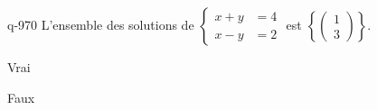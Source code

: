 \begin{truefalse}{q-970}
L'ensemble des solutions de $\begin{cases} x+y &= 4 \\ x-y &= 2 \end{cases}$ est $\left\{\begin{pmatrix}1\\3\end{pmatrix}\right\}$.
\item Vrai
\item* Faux
\end{truefalse}

